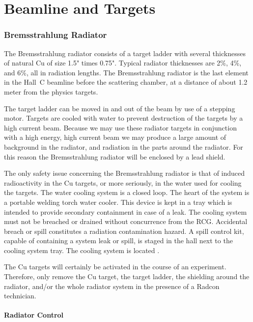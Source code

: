 %
%

\section{Beamline and Targets}



\subsubsection{Bremsstrahlung Radiator}

The Bremsstrahlung radiator consists of a target ladder with
several thicknesses of natural Cu of size 1.5" times 0.75".
Typical radiator thicknesses are 2\%, 4\%, and 6\%, all in
radiation lengths. The Bremsstrahlung radiator is the last element
in the Hall~C beamline before the scattering chamber, at a distance
of about 1.2 meter from the physics targets.

The target ladder can be moved in and out of the beam by use of
a stepping motor. Targets are cooled with water to prevent destruction
of the targets by a high current beam.
Because we may use these radiator targets in conjunction with a high
energy, high current beam we may produce a large amount of background
in the radiator, and radiation in the parts around the radiator.
For this reason the Bremsstrahlung radiator will be enclosed by a lead
shield.

The only safety issue concerning the Bremsstrahlung radiator is that of
induced radioactivity in
the Cu targets, or more seriously, in the water used for cooling the targets.
 The water cooling system is a closed loop. The heart of the system is
a portable welding torch water cooler. This device is kept in a tray
which is intended to provide secondary containment in case of a leak.
 The cooling system must not be breached or drained without concurrence from the RCG.  
Accidental breach or spill constitutes a radiation contamination hazard.  A spill control kit, 
capable of containing a system leak or spill, is staged in the hall next to the cooling system 
tray.  The cooling system is located    .

The Cu targets will certainly be activated in the course of an experiment.
Therefore, only remove
the Cu target, the target ladder, the shielding around the radiator,
and/or the whole radiator system in the presence of a Radcon technician.

\paragraph{Radiator Control}

